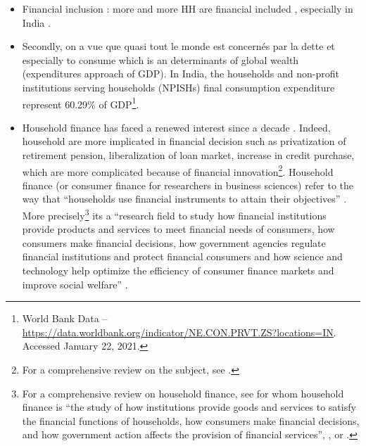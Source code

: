 \documentclass[a4paper, 11pt, onecolumn]{article}
\begin{document}
\begin{itemize}
\item Financial inclusion : more and more HH are financial included \citep{Badarinza2019}, especially in India \citep{Chakravartya2013}. 
\item Secondly, on a vue que quasi tout le monde est concernés par la dette et especially to consume which is an determinants of global wealth (expenditures approach of GDP).
In India, the households and non-profit institutions serving households (NPISHs) final consumption expenditure represent 60.29\% of GDP\footnote{World Bank Data -- \url{https://data.worldbank.org/indicator/NE.CON.PRVT.ZS?locations=IN}. Accessed January 22, 2021.}.
\item Household finance has faced a renewed interest since a decade \citep{Guiso2013}.
Indeed, household are more implicated in financial decision such as privatization of retirement pension, liberalization of loan market, increase in credit purchase, which are more complicated because of financial innovation\footnote{For a comprehensive review on the subject, see \cite{Tufano2003}.}.
Household finance (or consumer finance for researchers in business sciences) refer to the way that ``households use financial instruments to attain their objectives'' \citep{Campbell2006}.
More precisely\footnote{For a comprehensive review on household finance, see \cite{Tufano2009} for whom household finance is ``the study of how institutions provide goods and services to satisfy the financial functions of households, how consumers make financial decisions, and how government action affects the provision of financial services'', \cite{Guiso2013}, or \cite{Xiao2020}.}  its a ``research field to study how financial institutions provide products and services to meet financial needs of consumers, how consumers make financial decisions, how government agencies regulate financial institutions and protect financial consumers and how science and technology help optimize the efficiency of consumer finance markets and improve social welfare'' \citep{Xiao2020}.
\end{itemize}





\end{document}
